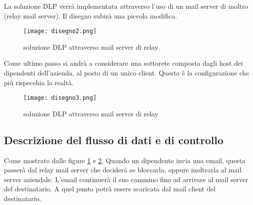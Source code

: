   \pagebreak
  La soluzione DLP verrà implementata attraverso l'uso di un mail server di inoltro (relay mail server).
  Il disegno subirà una piccola modifica.

  \begin{figure}[htp]
    \centering
    \texttt{[image: disegno2.png]}
    \caption{soluzione DLP attraverso mail server di relay}\label{disegno2}
  \end{figure}

  Come ultimo passo si andrà a considerare una sottorete composta dagli host dei dipendenti dell'azienda, al
  posto di un unico client. Questa è la configurazione che più rispecchia la realtà.

  \begin{figure}[htp]
    \centering
    \texttt{[image: disegno3.png]}
    \caption{soluzione DLP attraverso mail server di relay}\label{disegno3}
  \end{figure}

  \subsection{Descrizione del flusso di dati e di controllo}
  Come mostrato dalle figure \ref{disegno2} e \ref{disegno3}, Quando un dipendente invia una email, questa
  passerà dal relay mail server che deciderà se bloccarla, oppure inoltrarla al mail server aziendale. L'email
  continuerà il suo cammino fino ad arrivare al mail server del destinatario. A quel punto potrà essere scaricata
  dal mail client del destinatario.